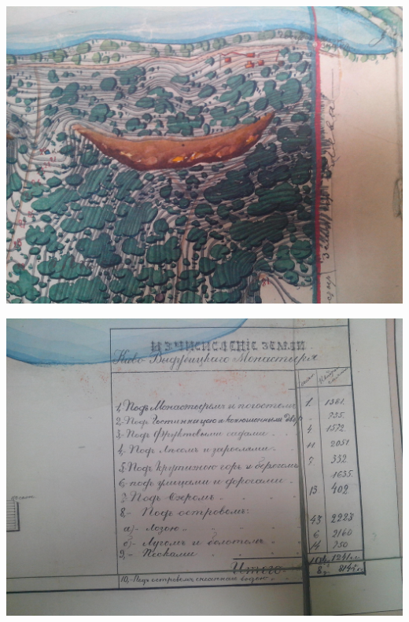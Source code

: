 \begin{center}
\includegraphics[width=\linewidth]{chast-vosp/zver/IMG_20170627_154016.jpg}
\end{center}

\begin{center}
\includegraphics[width=\linewidth]{chast-vosp/zver/IMG_20170627_154027.jpg}
\end{center}

\vspace*{\fill}

\newpage

\vspace*{\fill}


